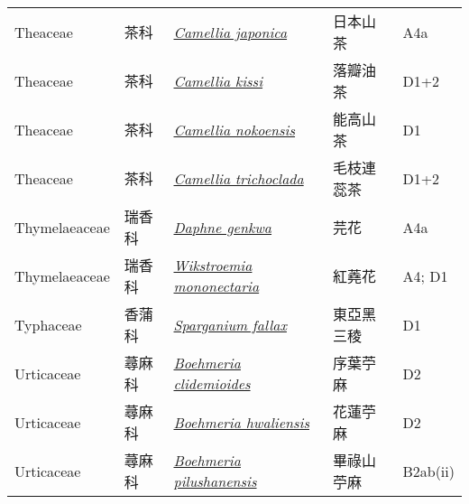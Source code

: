 {\begin{longtable}{p{2.5cm}p{2cm}p{5cm}p{2.5cm}p{3cm}}
    Theaceae & 茶科 & \href{http://www.theplantlist.org/tpl1.1/search?q=Camellia+japonica}{\textit{Camellia japonica} } & 日本山茶 & A4a \index{Camellia@\textit{Camellia}!japonica@\textit{japonica}}  \index{日本山茶} \\
    Theaceae & 茶科 & \href{http://www.theplantlist.org/tpl1.1/search?q=Camellia+kissi}{\textit{Camellia kissi} } & 落瓣油茶 & D1+2 \index{Camellia@\textit{Camellia}!kissi@\textit{kissi}}  \index{落瓣油茶} \\
    Theaceae & 茶科 & \href{http://www.theplantlist.org/tpl1.1/search?q=Camellia+nokoensis}{\textit{Camellia nokoensis} } & 能高山茶 & D1 \index{Camellia@\textit{Camellia}!nokoensis@\textit{nokoensis}}  \index{能高山茶} \\
    Theaceae & 茶科 & \href{http://www.theplantlist.org/tpl1.1/search?q=Camellia+trichoclada}{\textit{Camellia trichoclada} } & 毛枝連蕊茶 & D1+2 \index{Camellia@\textit{Camellia}!trichoclada@\textit{trichoclada}}  \index{毛枝連蕊茶} \\
    Thymelaeaceae & 瑞香科 & \href{http://www.theplantlist.org/tpl1.1/search?q=Daphne+genkwa}{\textit{Daphne genkwa} } & 芫花 & A4a \index{Daphne@\textit{Daphne}!genkwa@\textit{genkwa}}  \index{芫花} \\
    Thymelaeaceae & 瑞香科 & \href{http://www.theplantlist.org/tpl1.1/search?q=Wikstroemia+mononectaria}{\textit{Wikstroemia mononectaria} } & 紅蕘花 & A4; D1 \index{Wikstroemia@\textit{Wikstroemia}!mononectaria@\textit{mononectaria}}  \index{紅蕘花} \\
    Typhaceae & 香蒲科 & \href{http://www.theplantlist.org/tpl1.1/search?q=Sparganium+fallax}{\textit{Sparganium fallax} } & 東亞黑三稜 & D1 \index{Sparganium@\textit{Sparganium}!fallax@\textit{fallax}}  \index{東亞黑三稜} \\
    Urticaceae & 蕁麻科 & \href{http://www.theplantlist.org/tpl1.1/search?q=Boehmeria+clidemioides}{\textit{Boehmeria clidemioides} } & 序葉苧麻 & D2 \index{Boehmeria@\textit{Boehmeria}!clidemioides@\textit{clidemioides}}  \index{序葉苧麻} \\
    Urticaceae & 蕁麻科 & \href{http://www.theplantlist.org/tpl1.1/search?q=Boehmeria+hwaliensis}{\textit{Boehmeria hwaliensis} } & 花蓮苧麻 & D2 \index{Boehmeria@\textit{Boehmeria}!hwaliensis@\textit{hwaliensis}}  \index{花蓮苧麻} \\
    Urticaceae & 蕁麻科 & \href{http://www.theplantlist.org/tpl1.1/search?q=Boehmeria+pilushanensis}{\textit{Boehmeria pilushanensis} } & 畢祿山苧麻 & B2ab(ii) \index{Boehmeria@\textit{Boehmeria}!pilushanensis@\textit{pilushanensis}}  \index{畢祿山苧麻} \\

\end{longtable}}
